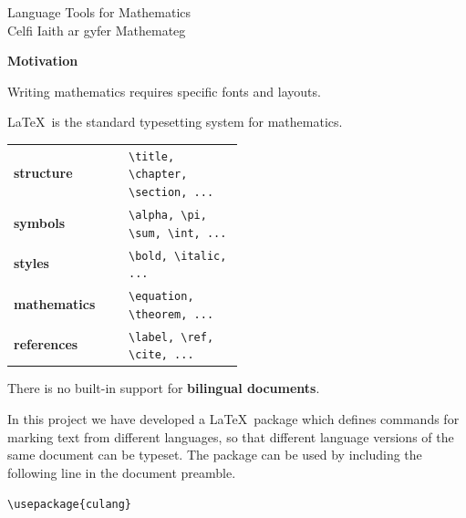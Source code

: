 \documentclass{a0poster}
\let\oldLaTeX=\LaTeX
\def\LaTeX{\rmfamily\oldLaTeX\ \normalfont}
\begin{document}
\vspace*{2ex}
\begin{paracol}{2}
\centering
\veryHuge 
Language Tools for Mathematics \\[2ex]
\switchcolumn
Celfi Iaith ar gyfer Mathemateg \\[2ex]
\end{paracol}

\begin{paracol}{3}

\begin{pbox}
\textbf{\LARGE Motivation}
\Large

Writing mathematics requires specific fonts and layouts.

\LaTeX is the standard typesetting system for mathematics.

\smallskip
\setlength{\tabcolsep}{1ex}
\begin{tabular}{lp{0.5\linewidth}}
\textbf{structure} &
\verb:\title, \chapter, \section, ...: \\
\textbf{symbols} &
\verb+\alpha, \pi, \sum, \int, ...+ \\
\textbf{styles} &
\verb+\bold, \italic, ...+ \\
\textbf{mathematics} &
\verb+\equation, \theorem, ...+ \\
\textbf{references} &
\verb+\label, \ref, \cite, ...+ \\
\end{tabular}
\smallskip

There is no built-in support for \textbf{bilingual documents}.

In this project we have developed a \LaTeX package which defines commands for marking text from different languages, so that different language versions of the same document can be typeset. The package can be used by including the following line in the document preamble.

\color{deepgreen}\verb+\usepackage{culang}+\color{black}
\end{pbox}


\end{paracol}
\end{document}

